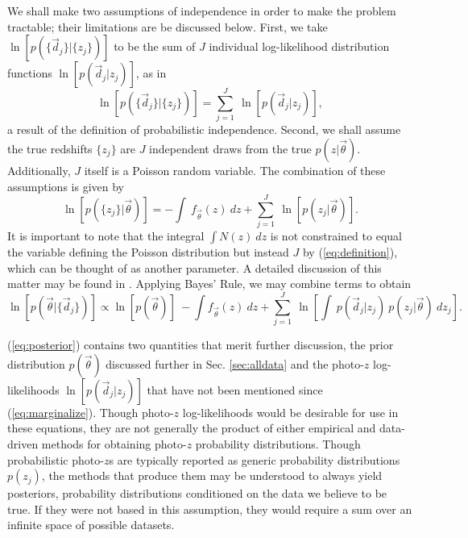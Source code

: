 \documentclass[preprint]{aastex}
\begin{document}
We shall make two assumptions of independence in order to make the problem 
tractable; their limitations are be discussed below.  First, we take 
$\ln[p(\{\vec{d}_{j}\}|\{z_{j}\})]$ to be the sum of $J$ individual 
log-likelihood distribution functions $\ln[p(\vec{d}_{j}|z_{j})]$, as in 
\begin{equation}
\label{eq:indiedat}
\ln[p(\{\vec{d}_{j}\}|\{z_{j}\})] = \sum_{j=1}^{J}\ \ln[p(\vec{d}_{j}|z_{j})],
\end{equation}
a result of the definition of probabilistic independence.  Second, we shall 
assume the true redshifts $\{z_{j}\}$ are $J$ independent draws from the true 
$p(z|\vec{\theta})$.  Additionally, $J$ itself is a Poisson random variable.  
The combination of these assumptions is given by 
\begin{equation}
\label{eq:indie}
\ln[p(\{z_{j}\}|\vec{\theta})] = -\int\ f_{\vec{\theta}}(z)\ dz +  
\sum_{j=1}^{J}\ \ln[p(z_{j}|\vec{\theta})].
\end{equation}
It is important to note that the integral $\int N(z)\ dz$ is not constrained to 
equal the variable defining the Poisson distribution but instead $J$ by 
(\ref{eq:definition}), which can be thought of as another parameter.  A 
detailed discussion of this matter may be found in \citet{ForemanMackey2014}.  
Applying Bayes' Rule, we may combine terms to obtain 
\begin{equation}
\label{eq:posterior}
\ln[p(\vec{\theta}|\{\vec{d}_{j}\})] \propto \ln[p(\vec{\theta})]\ -\int 
f_{\vec{\theta}}(z)\ dz + \sum_{j=1}^{J}\ \ln\left[\int\ p(\vec{d}_{j}|z_{j})\ 
p(z_{j}|\vec{\theta})\ dz_{j}\right].
\end{equation}

(\ref{eq:posterior}) contains two quantities that merit further discussion, the 
prior distribution $p(\vec{\theta})$ discussed further in Sec. 
\ref{sec:alldata} and the photo-$z$ log-likelihoods $\ln[p(\vec{d}_{j}|z_{j})]$ 
that have not been mentioned since (\ref{eq:marginalize}).  Though photo-$z$ 
log-likelihoods would be desirable for use in these equations, they are not 
generally the product of either empirical and data-driven methods for obtaining 
photo-$z$ probability distributions.  Though probabilistic photo-$z$s are 
typically reported as generic probability distributions $p(z_{j})$, the methods 
that produce them may be understood to always yield posteriors, probability 
distributions conditioned on the data we believe to be true.  If they were not 
based in this assumption, they would require a sum over an infinite space of 
possible datasets.
\end{document}
